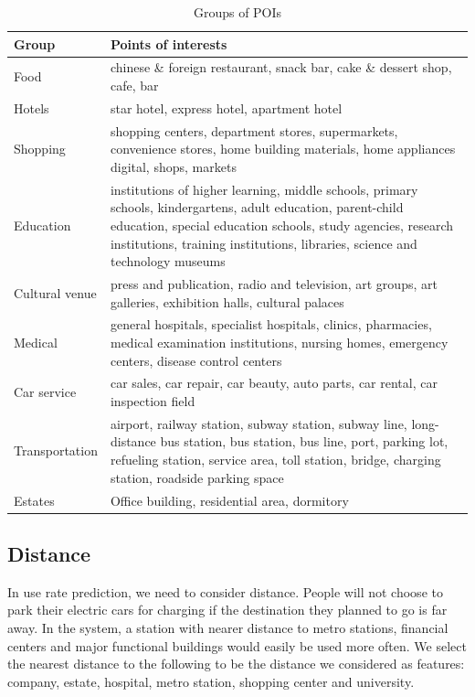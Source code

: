 \begin{table}[htbp]
	\caption{Groups of POIs}
	\begin{center}
		\begin{tabular}{|l|p{5cm}|}
			\hline
			Group & Points of interests\\
			\hline
			Food & chinese \& foreign restaurant, snack bar, cake \& dessert shop, cafe, bar\\
			\hline
			Hotels & star hotel, express hotel, apartment hotel\\
			\hline
			Shopping & shopping centers, department stores, supermarkets, convenience stores, home building materials, home appliances digital, shops, markets\\
			\hline
			Education & institutions of higher learning, middle schools, primary schools, kindergartens, adult education, parent-child education, special education schools, study agencies, research institutions, training institutions, libraries, science and technology museums\\
			\hline
			Cultural venue & press and publication, radio and television, art groups, art galleries, exhibition halls, cultural palaces\\
			\hline
			Medical & general hospitals, specialist hospitals, clinics, pharmacies, medical examination institutions, nursing homes, emergency centers, disease control centers\\
			\hline
			Car service & car sales, car repair, car beauty, auto parts, car rental, car inspection field\\
			\hline
			Transportation & airport, railway station, subway station, subway line, long-distance bus station, bus station, bus line, port, parking lot, refueling station, service area, toll station, bridge, charging station, roadside parking space\\
			\hline
			Estates & Office building, residential area, dormitory\\
			\hline
		\end{tabular}
		\label{tab1}
	\end{center}
\end{table}

\subsection{Distance}

In use rate prediction, we need to consider distance. People will not choose to park their electric cars for charging if the destination they planned to go is far away. In the system, a station with nearer distance to metro stations, financial centers and major functional buildings would easily be used more often. We select the nearest distance to the following to be the distance we considered as features: company, estate, hospital, metro station, shopping center and university.

